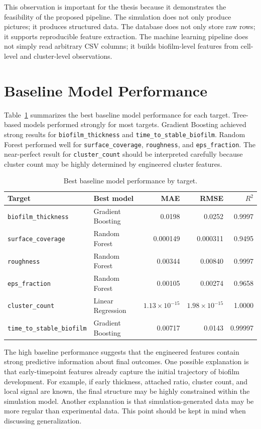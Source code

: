 \documentclass[12pt,a4paper,oneside]{report}
\begin{document}
This observation is important for the thesis because it demonstrates the feasibility of the proposed pipeline. The simulation does not only produce pictures; it produces structured data. The database does not only store raw rows; it supports reproducible feature extraction. The machine learning pipeline does not simply read arbitrary CSV columns; it builds biofilm-level features from cell-level and cluster-level observations.

\section{Baseline Model Performance}
Table~\ref{tab:baseline-results} summarizes the best baseline model performance for each target. Tree-based models performed strongly for most targets. Gradient Boosting achieved strong results for \texttt{biofilm\_thickness} and \texttt{time\_to\_stable\_biofilm}. Random Forest performed well for \texttt{surface\_coverage}, \texttt{roughness}, and \texttt{eps\_fraction}. The near-perfect result for \texttt{cluster\_count} should be interpreted carefully because cluster count may be highly determined by engineered cluster features.

\begin{table}[H]
\centering
\caption{Best baseline model performance by target.}
\label{tab:baseline-results}
\begin{tabular}{llrrr}
\toprule
Target & Best model & MAE & RMSE & $R^2$\\
\midrule
\texttt{biofilm\_thickness} & Gradient Boosting & 0.0198 & 0.0252 & 0.9997\\
\texttt{surface\_coverage} & Random Forest & 0.000149 & 0.000311 & 0.9495\\
\texttt{roughness} & Random Forest & 0.00344 & 0.00840 & 0.9997\\
\texttt{eps\_fraction} & Random Forest & 0.00105 & 0.00274 & 0.9658\\
\texttt{cluster\_count} & Linear Regression & $1.13\times10^{-15}$ & $1.98\times10^{-15}$ & 1.0000\\
\texttt{time\_to\_stable\_biofilm} & Gradient Boosting & 0.00717 & 0.0143 & 0.99997\\
\bottomrule
\end{tabular}
\end{table}

The high baseline performance suggests that the engineered features contain strong predictive information about final outcomes. One possible explanation is that early-timepoint features already capture the initial trajectory of biofilm development. For example, if early thickness, attached ratio, cluster count, and local signal are known, the final structure may be highly constrained within the simulation model. Another explanation is that simulation-generated data may be more regular than experimental data. This point should be kept in mind when discussing generalization.
\end{document}
